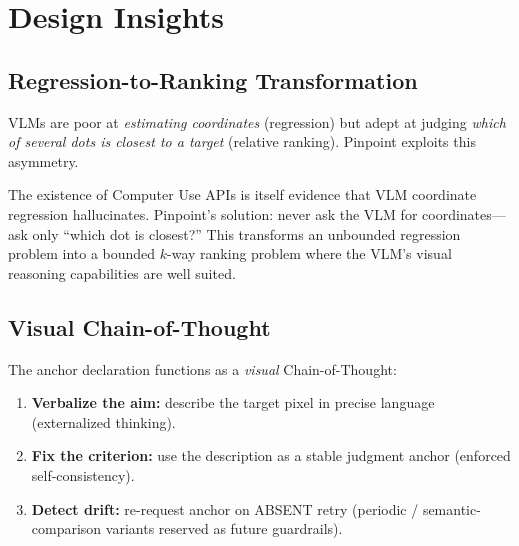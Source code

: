 \documentclass[sigconf,nonacm]{acmart}
\begin{document}





\section{Design Insights}
\label{sec:insights}

\subsection{Regression-to-Ranking Transformation}

VLMs are poor at \emph{estimating coordinates} (regression) but adept
at judging \emph{which of several dots is closest to a target}
(relative ranking).  Pinpoint exploits this asymmetry.

The existence of Computer Use APIs is itself evidence that VLM
coordinate regression hallucinates.  Pinpoint's solution: never ask
the VLM for coordinates---ask only ``which dot is closest?''
This transforms an unbounded regression problem into a bounded
$k$-way ranking problem where the VLM's visual reasoning capabilities
are well suited.

\subsection{Visual Chain-of-Thought}

The anchor declaration functions as a \emph{visual} Chain-of-Thought:

\begin{enumerate}
  \item \textbf{Verbalize the aim:} describe the target pixel in
    precise language (externalized thinking).
  \item \textbf{Fix the criterion:} use the description as a stable
    judgment anchor (enforced self-consistency).
  \item \textbf{Detect drift:} re-request anchor on ABSENT retry
    (periodic / semantic-comparison variants reserved as future
    guardrails).
\end{enumerate}
\end{document}
